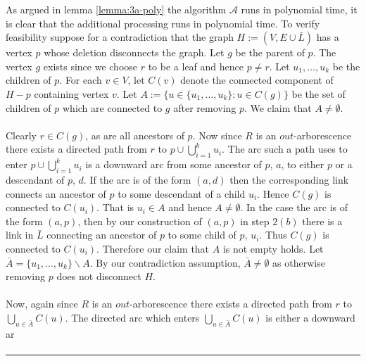 \documentclass[letterpaper,12pt,oneside,onecolumn]{article}
\newcommand{\cA}{\mathcal{A}} \newcommand{\cB}{\mathcal{B}}
\newenvironment{proof}{{\bf Proof:  }}{\hfill\rule{2mm}{2mm}}
\begin{document}
\begin{proof}
As argued in lemma \ref{lemma:3a-poly} the algorithm $\cA$ runs in polynomial time, it is clear that the additional processing runs in polynomial time. To verify feasibility suppose for a contradiction that the graph $H := (V, E \cup \bar{L})$ has a vertex $p$ whose deletion disconnects the graph. Let $g$ be the parent of $p$. The vertex $g$ exists since we choose $r$ to be a leaf and hence $p \neq r$. Let $u_1, \dots, u_k$ be the children of $p$. For each $v \in V$, let $C(v)$ denote the connected component of $H-p$ containing vertex $v$. Let $A := \{u \in \{u_1, \dots, u_k\} : u \in C(g)\}$ be the set of children of $p$ which are connected to $g$ after removing $p$. We claim that $A \neq \emptyset$.
\paragraph{}
Clearly $r \in C(g)$, as are all ancestors of $p$. Now since $R$ is an $out$-arborescence there exists a directed path from $r$ to $p \cup \bigcup_{i=1}^k u_i$. The arc such a path uses to enter $p \cup \bigcup_{i=1}^k u_i$ is a downward arc from some ancestor of $p$, $a$, to either $p$ or a descendant of $p$, $d$. If the arc is of the form $(a,d)$ then the corresponding link connects an ancestor of $p$ to some descendant of a child $u_i$. Hence $C(g)$ is connected to $C(u_i)$. That is $u_i \in A$ and hence $A \neq \emptyset$. In the case the arc is of the form $(a,p)$, then by our construction of $(a,p)$ in step $2(b)$ there is a link in $\bar{L}$ connecting an ancestor of $p$ to some child of $p$, $u_i$. Thus $C(g)$ is connected to $C(u_i)$. Therefore our claim that $A$ is not empty holds. Let $\bar{A} = \{u_1, \dots, u_k\} \backslash A$. By our contradiction assumption, $\bar{A}\neq \emptyset$ as otherwise removing $p$ does not disconnect $H$.
\paragraph{}
Now, again since $R$ is an $out$-arborescence there exists a directed path from $r$ to $\bigcup_{u \in \bar{A}} C(u)$. The directed arc which enters $\bigcup_{u \in \bar{A}} C(u)$ is either a downward ar 
\paragraph{} 
\end{proof}
\section{}
\end{document}
